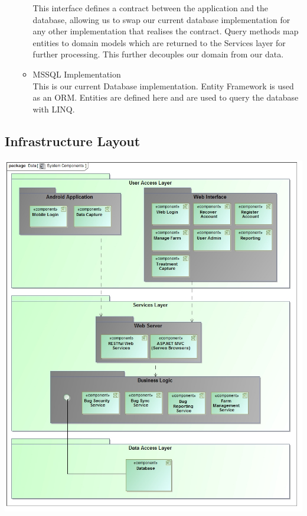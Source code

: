 \documentclass[11pt,a4paper,titlepage]{article}
\begin{document}
\begin{itemize}
\begin{itemize}
						This interface defines a contract between the application and the database, allowing us to swap our current database implementation for any other implementation that realises the contract. Query methods map entities to domain models which are returned to the Services layer for further processing. This further decouples our domain from our data.
						\item MSSQL Implementation\\
						This is our current Database implementation. Entity Framework is used as an ORM. Entities are defined here and are used to query the database with LINQ.						
					\end{itemize}
			\end{itemize}
	\subsection{Infrastructure Layout}
		\includegraphics[width=\linewidth]{SystemComponents}	
\end{document}
